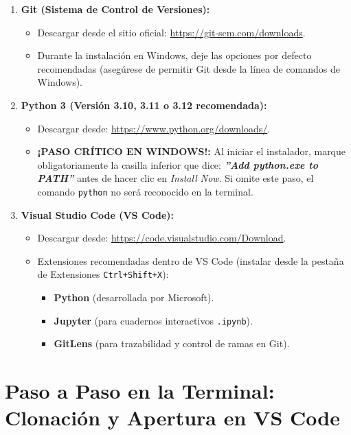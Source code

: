 \documentclass[11pt,a4paper]{article}
\begin{document}
\begin{enumerate}[leftmargin=*,itemsep=4pt]
  \item \textbf{Git (Sistema de Control de Versiones):}
  \begin{itemize}
    \item Descargar desde el sitio oficial: \url{https://git-scm.com/downloads}.
    \item Durante la instalación en Windows, deje las opciones por defecto recomendadas (asegúrese de permitir Git desde la línea de comandos de Windows).
  \end{itemize}

  \item \textbf{Python 3 (Versión 3.10, 3.11 o 3.12 recomendada):}
  \begin{itemize}
    \item Descargar desde: \url{https://www.python.org/downloads/}.
    \item \textbf{\color{rojoAlerta}¡PASO CRÍTICO EN WINDOWS!:} Al iniciar el instalador, marque obligatoriamente la casilla inferior que dice: \textbf{\textit{''Add python.exe to PATH''}} antes de hacer clic en \textit{Install Now}. Si omite este paso, el comando \texttt{python} no será reconocido en la terminal.
  \end{itemize}

  \item \textbf{Visual Studio Code (VS Code):}
  \begin{itemize}
    \item Descargar desde: \url{https://code.visualstudio.com/Download}.
    \item Extensiones recomendadas dentro de VS Code (instalar desde la pestaña de Extensiones \texttt{Ctrl+Shift+X}):
    \begin{itemize}
      \item \textbf{Python} (desarrollada por Microsoft).
      \item \textbf{Jupyter} (para cuadernos interactivos \texttt{.ipynb}).
      \item \textbf{GitLens} (para trazabilidad y control de ramas en Git).
    \end{itemize}
  \end{itemize}
\end{enumerate}

\section{Paso a Paso en la Terminal: Clonación y Apertura en VS Code}
\end{document}
